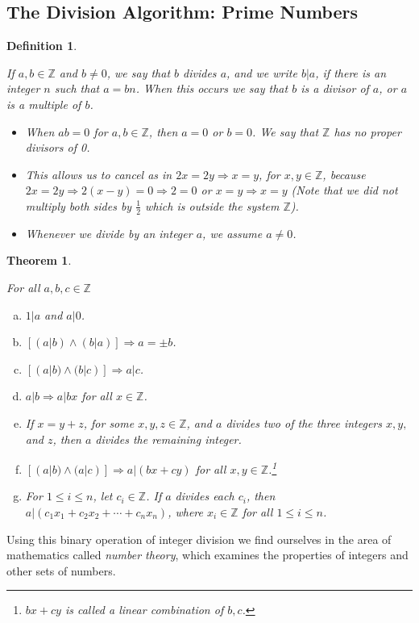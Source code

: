 \documentclass[12pt]{article}
\newtheorem{definition}{Definition} [section]
\newtheorem{theorem}{Theorem} [section]
\begin{document}
\subsection{The Division Algorithm: Prime Numbers}
\begin{definition}
\begin{em}
If $a, b \in \mathbb{Z}$ and $b \neq 0$, we say that $b$ divides $a$, and we write $b|a$, if there is an integer $n$ such that $a = bn$. When this occurs we say that $b$ is a \emph{divisor} of $a$, or $a$ is a \emph{multiple} of $b$.
\begin{itemize}
\item When $ab = 0$ for $a,b \in \mathbb{Z}$, then $a=0$ or $b=0$. We say that $\mathbb{Z}$ has no proper divisors of 0.
\item This allows us to \emph{cancel} as in $2x=2y \Rightarrow x=y$, for $x, y \in \mathbb{Z}$, because $2x=2y \Rightarrow 2(x-y)=0 \Rightarrow 2=0$ or $x=y \Rightarrow x=y$ (Note that we did not multiply both sides by $\frac{1}{2}$ which is outside the system $\mathbb{Z}$).
\item Whenever we divide by an integer $a$, we assume $a \neq 0$.
\end{itemize}
\end{em}
\end{definition}
\begin{theorem}
\begin{em}
For all $a,b,c \in \mathbb{Z}$
\begin{enumerate} [a)]
\item $1|a$ and $a|0$.
\item $[(a|b) \wedge (b|a)] \Rightarrow a=\pm b$.
\item $[(a|b) \wedge (b|c)] \Rightarrow a|c$.
\item $a|b \Rightarrow a|bx$ for all $x \in \mathbb{Z}$.
\item If $x = y + z$, for some $x, y, z \in \mathbb{Z}$, and $a$ divides two of the three integers $x, y,$ and $z$, then $a$ divides the remaining integer.
\item $[(a|b) \wedge (a|c)] \Rightarrow a|(bx+cy)$ for all $x, y \in \mathbb{Z}$.\footnote{$bx +cy$ is called a \emph{linear combination of} $b, c$.}
\item For $1 \leq i \leq n$, let $c_i \in \mathbb{Z}$. If $a$ divides each $c_i$, then $a|(c_1x_1 + c_2x_2 + \cdots + c_nx_n)$, where $x_i \in \mathbb{Z}$ for all $1 \leq i \leq n$.
\end{enumerate}
\end{em}
\end{theorem}
Using this binary operation of integer division we find ourselves in the area of mathematics called \emph{number theory}, which examines the properties of integers and other sets of numbers.
\end{document}
